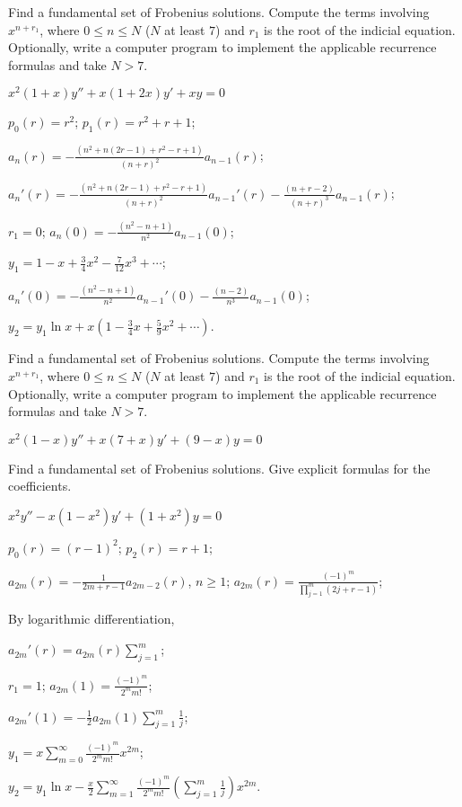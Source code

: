 \documentclass{ximera}
\begin{document}
\begin{problem}\label{exer:7.6.26}
Find a
fundamental set of Frobenius solutions. Compute the terms involving
$x^{n+r_1}$, where $0\le n\le N$ ($N$ at least $7$) and $r_1$ is the
root of the indicial equation. Optionally, write a computer program to
implement the applicable recurrence formulas and take $N>7$.

$x^2(1+x)y''+x(1+2x)y'+xy=0$

\begin{solution}
    $p_0(r)=r^2$;
$p_1(r)=r^2+r+1$;

$a_n(r)=
-\frac{(n^2+n(2r-1)+r^2-r+1)}{(n+r)^2}a_{n-1}(r)$;


$a_n'(r)=
-\frac{(n^2+n(2r-1)+r^2-r+1)}{(n+r)^2}a_{n-1}'(r)
-\frac{(n+r-2)}{(n+r)^3}a_{n-1}(r)$;

$r_1=0$;
$a_n(0)=-\frac{(n^2-n+1)}{ n^2}a_{n-1}(0)$;

$y_1=1-x+\frac{3}{4}x^2-\frac{7}{12}x^3+\cdots$;

$a_n'(0)=
-\frac{(n^2-n+1)}{ n^2}a_{n-1}'(0)-\frac{(n-2)}{ n^3}a_{n-1}(0)$;

$y_2=y_1\ln x+x\left(1-\frac{3}{4}x+\frac{5}{9}x^2+\cdots\right)$.
\end{solution}
\end{problem}

\begin{problem}\label{exer:7.6.27}
Find a
fundamental set of Frobenius solutions. Compute the terms involving
$x^{n+r_1}$, where $0\le n\le N$ ($N$ at least $7$) and $r_1$ is the
root of the indicial equation. Optionally, write a computer program to
implement the applicable recurrence formulas and take $N>7$. 

$x^2(1-x)y''+x(7+x)y'+(9-x)y=0$
\end{problem}


\begin{problem}\label{exer:7.6.28}
Find a
fundamental set of Frobenius solutions. Give explicit formulas for the
coefficients.

$x^2y''-x(1-x^2)y'+(1+x^2)y=0$

\begin{solution}
    $p_0(r)=(r-1)^2$;
$p_2(r)=r+1$;

$a_{2m}(r)=-\frac{1}{ 2m+r-1}
a_{2m-2}(r)$, $n\geq 1$;
 $a_{2m}(r)=\frac{(-1)^m}{\prod_{j=1}^m(2j+r-1)}$;

By logarithmic differentiation,

$a_{2m}'(r)= a_{2m}(r)\sum_{j=1}^m$;

$r_1=1$;
$a_{2m}(1)=\frac{(-1)^m}{2^mm!}$;

$a_{2m}'(1)=-\frac{1}{2}a_{2m}(1)\sum_{j=1}^m\frac{1}{ j}$;

$y_1=x\sum_{m=0}^\infty\frac{(-1)^m}{2^mm!}x^{2m}$;

$y_2=y_1\ln x-\frac{x}{2}\sum_{m=1}^\infty\frac{(-1)^m}{
2^mm!}\left(\sum_{j=1}^m\frac{1}{ j}\right)x^{2m}$.

\end{solution}
\end{problem}
\end{document}
